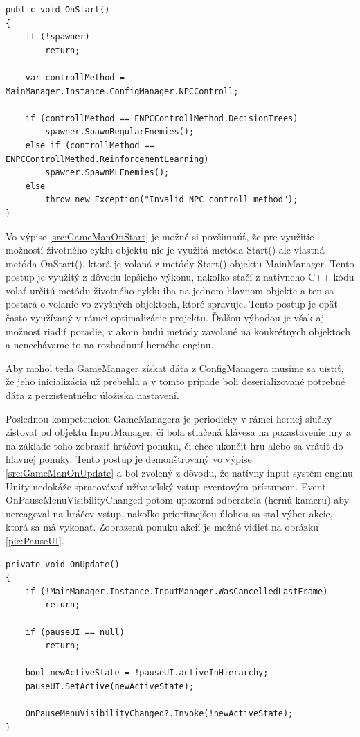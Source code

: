 \documentclass[slovak, master]{diploma}
\begin{document}
\vspace{8pt}
\begin{lstlisting}[label=src:GameManOnStart,caption={Inštancovanie NPC agentov na základe nastavení}]
public void OnStart() 
{
    if (!spawner)
        return;

    var controllMethod = MainManager.Instance.ConfigManager.NPCControll;

    if (controllMethod == ENPCControllMethod.DecisionTrees)
        spawner.SpawnRegularEnemies();
    else if (controllMethod == ENPCControllMethod.ReinforcementLearning)
        spawner.SpawnMLEnemies();
    else
        throw new Exception("Invalid NPC controll method");
}
\end{lstlisting}

Vo výpise \ref{src:GameManOnStart} je možné si povšimnúť, že pre využitie možností životného cyklu objektu nie je využitá metóda Start() ale vlastná metóda OnStart(), ktorá je volaná z metódy Start() objektu MainManager. Tento postup je využitý z dôvodu lepšieho výkonu, nakoľko stačí z natívneho C++ kódu volať určitú metódu životného cyklu iba na jednom hlavnom objekte a ten sa postará o volanie vo zvyšných objektoch, ktoré spravuje. Tento postup je opäť často využívaný v rámci optimalizácie projektu. Ďalšou výhodou je však aj možnosť riadiť poradie, v akom budú metódy zavolané na konkrétnych objektoch a nenechávame to na rozhodnutí herného enginu. 

Aby mohol teda GameManager získať dáta z ConfigManagera musíme sa uistiť, že jeho inicializácia už prebehla a v tomto prípade boli deserializované potrebné dáta z perzistentného úložiska nastavení. 

Poslednou kompetenciou GameManagera je periodicky v rámci hernej slučky zisťovať od objektu InputManager, či bola stlačená klávesa na pozastavenie hry a na základe toho zobraziť hráčovi ponuku, či chce ukončiť hru alebo sa vrátiť do hlavnej ponuky. Tento postup je demonštrovaný vo výpise \ref{src:GameManOnUpdate} a bol zvolený z dôvodu, že natívny input systém enginu Unity nedokáže spracovávať užívateľský vstup eventovým prístupom. Event OnPauseMenuVisibilityChanged potom upozorní odberateľa (hernú kameru) aby nereagoval na hráčov vstup, nakoľko prioritnejšou úlohou sa stal výber akcie, ktorá sa má vykonať. Zobrazenú ponuku akcií je možné vidieť na obrázku \ref{pic:PauseUI}.

\vspace{8pt}
\begin{lstlisting}[label=src:GameManOnUpdate,caption={Metóda OnUpdate triedy GameManager}]
private void OnUpdate() 
{
    if (!MainManager.Instance.InputManager.WasCancelledLastFrame)
        return;

    if (pauseUI == null)
        return;

    bool newActiveState = !pauseUI.activeInHierarchy;
    pauseUI.SetActive(newActiveState);
    
    OnPauseMenuVisibilityChanged?.Invoke(!newActiveState);
}
\end{lstlisting}
\end{document}
